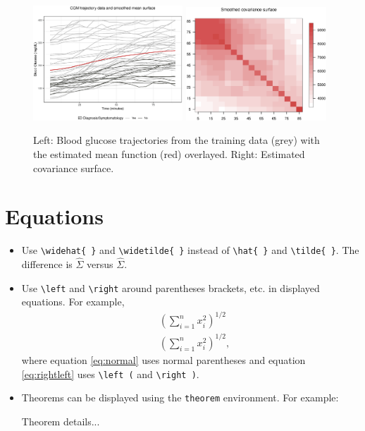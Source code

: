 \documentclass[useAMS, referee, usenatbib]{biom}
\begin{document}
\begin{figure}[b]
  \centering
  {\includegraphics[width=0.5\textwidth]{figures/muhat1.eps}}
  \hspace*{\fill}
  {\includegraphics[width=0.47\textwidth]{figures/Sigmahat1.eps}}
  \caption{Left: Blood glucose trajectories from the training data (grey) with the estimated mean function (red) overlayed. Right: Estimated covariance surface.}\label{fig:fig1}
\end{figure}


\section*{Equations}
\begin{itemize}
\item Use \texttt{\textbackslash widehat\{ \}} and \texttt{\textbackslash widetilde\{ \}} instead of
\texttt{\textbackslash hat\{ \}} and \texttt{\textbackslash tilde\{ \}}. The difference is $\widehat{\Sigma}$ versus $\hat{\Sigma}$.
\item Use \texttt{\textbackslash left} and \texttt{\textbackslash right} around parentheses brackets, etc. in displayed equations. For example,
\begin{align}
&(\sum_{i=1}^n x_i^2)^{1/2}\label{eq:normal}\\
&\left (\sum_{i=1}^n x_i^2 \right )^{1/2}\label{eq:rightleft},
\end{align}
where equation \ref{eq:normal} uses normal parentheses and equation \ref{eq:rightleft} uses \texttt{\textbackslash left (} and \texttt{\textbackslash right )}.
\item Theorems can be displayed using the \texttt{theorem} environment. For example:
\begin{theorem}
Theorem details...
\end{theorem}
\end{itemize}




\newpage





\label{lastpage}
\end{document}
